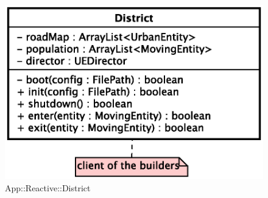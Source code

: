 \begin{figure}[h]
\centering
\includegraphics[scale=0.6,keepaspectratio]{images/solution/district.eps}
\caption{App::Reactive::District}
\label{fig:sd-app-district}
\end{figure}
\FloatBarrier
